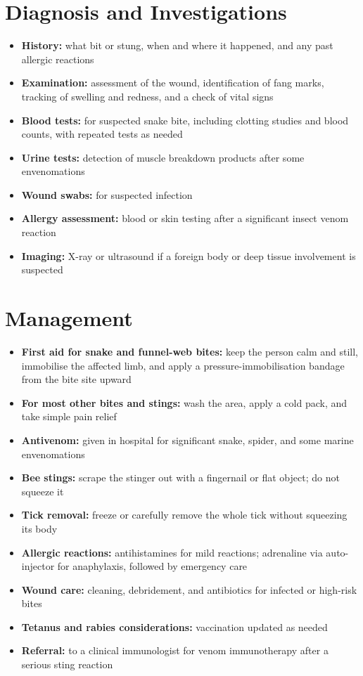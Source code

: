\section*{Diagnosis and Investigations}
\begin{itemize}
    \item \textbf{History:} what bit or stung, when and where it happened, and any past allergic reactions
    \item \textbf{Examination:} assessment of the wound, identification of fang marks, tracking of swelling and redness, and a check of vital signs
    \item \textbf{Blood tests:} for suspected snake bite, including clotting studies and blood counts, with repeated tests as needed
    \item \textbf{Urine tests:} detection of muscle breakdown products after some envenomations
    \item \textbf{Wound swabs:} for suspected infection
    \item \textbf{Allergy assessment:} blood or skin testing after a significant insect venom reaction
    \item \textbf{Imaging:} X-ray or ultrasound if a foreign body or deep tissue involvement is suspected
\end{itemize}

\section*{Management}
\begin{itemize}
    \item \textbf{First aid for snake and funnel-web bites:} keep the person calm and still, immobilise the affected limb, and apply a pressure-immobilisation bandage from the bite site upward
    \item \textbf{For most other bites and stings:} wash the area, apply a cold pack, and take simple pain relief
    \item \textbf{Antivenom:} given in hospital for significant snake, spider, and some marine envenomations
    \item \textbf{Bee stings:} scrape the stinger out with a fingernail or flat object; do not squeeze it
    \item \textbf{Tick removal:} freeze or carefully remove the whole tick without squeezing its body
    \item \textbf{Allergic reactions:} antihistamines for mild reactions; adrenaline via auto-injector for anaphylaxis, followed by emergency care
    \item \textbf{Wound care:} cleaning, debridement, and antibiotics for infected or high-risk bites
    \item \textbf{Tetanus and rabies considerations:} vaccination updated as needed
    \item \textbf{Referral:} to a clinical immunologist for venom immunotherapy after a serious sting reaction
\end{itemize}

